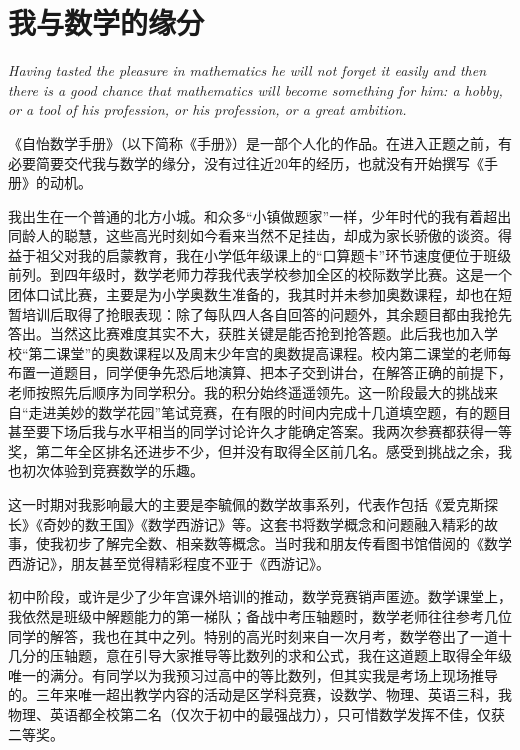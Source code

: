 
\section*{我与数学的缘分}

\par \emph{Having tasted the pleasure in mathematics he will not forget it easily and then there is a good chance that mathematics will become something for him: a hobby, or a tool of his profession, or his profession, or a great ambition.}
\par {}

《自怡数学手册》（以下简称《手册》）是一部个人化的作品。在进入正题之前，有必要简要交代我与数学的缘分，没有过往近20年的经历，也就没有开始撰写《手册》的动机。

我出生在一个普通的北方小城。和众多“小镇做题家”一样，少年时代的我有着超出同龄人的聪慧，这些高光时刻如今看来当然不足挂齿，却成为家长骄傲的谈资。得益于祖父对我的启蒙教育，我在小学低年级课上的“口算题卡”环节速度便位于班级前列。到四年级时，数学老师力荐我代表学校参加全区的校际数学比赛。这是一个团体口试比赛，主要是为小学奥数生准备的，我其时并未参加奥数课程，却也在短暂培训后取得了抢眼表现：除了每队四人各自回答的问题外，其余题目都由我抢先答出。当然这比赛难度其实不大，获胜关键是能否抢到抢答题。此后我也加入学校“第二课堂”的奥数课程以及周末少年宫的奥数提高课程。校内第二课堂的老师每布置一道题目，同学便争先恐后地演算、把本子交到讲台，在解答正确的前提下，老师按照先后顺序为同学积分。我的积分始终遥遥领先。这一阶段最大的挑战来自“走进美妙的数学花园”笔试竞赛，在有限的时间内完成十几道填空题，有的题目甚至要下场后我与水平相当的同学讨论许久才能确定答案。我两次参赛都获得一等奖，第二年全区排名还进步不少，但并没有取得全区前几名。感受到挑战之余，我也初次体验到竞赛数学的乐趣。

这一时期对我影响最大的主要是李毓佩的数学故事系列，代表作包括《爱克斯探长》《奇妙的数王国》《数学西游记》等。这套书将数学概念和问题融入精彩的故事，使我初步了解完全数、相亲数等概念。当时我和朋友传看图书馆借阅的《数学西游记》，朋友甚至觉得精彩程度不亚于《西游记》。

初中阶段，或许是少了少年宫课外培训的推动，数学竞赛销声匿迹。数学课堂上，我依然是班级中解题能力的第一梯队；备战中考压轴题时，数学老师往往参考几位同学的解答，我也在其中之列。特别的高光时刻来自一次月考，数学卷出了一道十几分的压轴题，意在引导大家推导等比数列的求和公式，我在这道题上取得全年级唯一的满分。有同学以为我预习过高中的等比数列，但其实我是考场上现场推导的。三年来唯一超出教学内容的活动是区学科竞赛，设数学、物理、英语三科，我物理、英语都全校第二名（仅次于初中的最强战力），只可惜数学发挥不佳，仅获二等奖。

